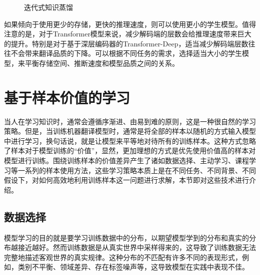 \begin{figure}[htp]
\centering

\caption{迭代式知识蒸馏}
\label{fig:13-13}
\end{figure}

\parinterval 如果倾向于使用更少的存储，更快的推理速度，则可以使用更小的学生模型。值得注意的是，对于Transformer模型来说，减少解码端的层数会给推理速度带来巨大的提升。特别是对于基于深层编码器的Transformer-Deep，适当减少解码端层数往往不会带来翻译品质的下降。可以根据不同任务的需求，选择适当大小的学生模型，来平衡存储空间、推断速度和模型品质之间的关系。


\sectionnewpage
\section{基于样本价值的学习}

\parinterval 当人在学习知识时，通常会遵循序渐进、由易到难的原则，这是一种很自然的学习策略。但是，当训练机器翻译模型时，通常是将全部的样本以随机的方式输入模型中进行学习，换句话说，就是让模型来平等地对待所有的训练样本。这种方式忽略了样本对于模型训练的“价值”，显然，更加理想的方式是优先使用价值高的样本对模型进行训练。围绕训练样本的价值差异产生了诸如数据选择、主动学习、课程学习等一系列的样本使用方法，这些学习策略本质上是在不同任务、不同背景、不同假设下，对如何高效地利用训练样本这一问题进行求解，本节即对这些技术进行介绍。


\subsection{数据选择}

\parinterval 模型学习的目的就是要学习训练数据中的分布，以期望模型学到的分布和真实的分布越接近越好。然而训练数据是从真实世界中采样得来的，这导致了训练数据无法完整地描述客观世界的真实规律。这种分布的不匹配有许多不同的表现形式，例如，类别不平衡、领域差异、存在标签噪声等，这导致模型在实践中表现不佳。

